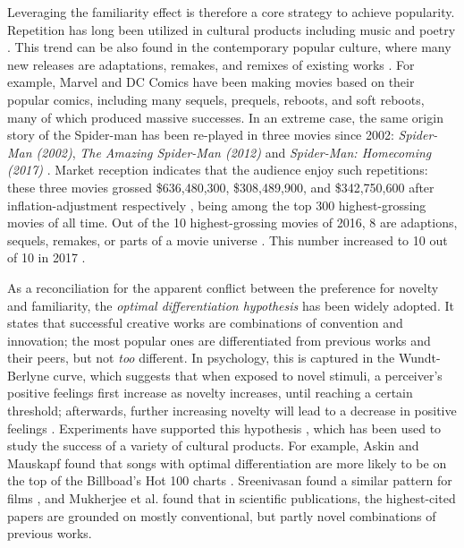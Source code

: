 \documentclass[letterpaper]{article} %
\begin{document}
Leveraging the familiarity effect is therefore a core strategy to achieve popularity. Repetition has long been utilized in cultural products including music and poetry \cite{huron2013psychological}. This trend can be also found in the contemporary popular culture, where many new releases are adaptations, remakes, and remixes of existing works \cite{manovich2007comes}. For example, Marvel and DC Comics have been making movies based on their popular comics, including many sequels, prequels, reboots, and soft reboots, many of which produced massive successes. In an extreme case, the same origin story of the Spider-man has been re-played in three movies since 2002: \emph{Spider-Man (2002)}, \emph{The Amazing Spider-Man (2012)} and \emph{Spider-Man: Homecoming (2017)} \cite{spiderman}. Market reception indicates that the audience enjoy such repetitions: these three movies grossed \$636,480,300, \$308,489,900, and \$342,750,600 after inflation-adjustment respectively \cite{spider-gross}, being among the top 300 highest-grossing movies of all time. Out of the 10 highest-grossing movies of 2016, 8 are adaptions, sequels, remakes, or parts of a movie universe \cite{2016film}. This number increased to 10 out of 10 in 2017 \cite{2017film}. 

As a reconciliation for the apparent conflict between the preference for novelty and familiarity, the \emph{optimal differentiation hypothesis} \cite{thompson2017hit} has been widely adopted. It states that successful creative works are combinations of convention and innovation; the most popular ones are differentiated from previous works and their peers, but not \emph{too} different. In psychology, this is captured in the Wundt-Berlyne curve, which suggests that when exposed to novel stimuli, a perceiver's positive feelings first increase as novelty increases, until reaching a certain threshold; afterwards, further increasing novelty will lead to a decrease in positive feelings \cite{berlyne1970novelty}. Experiments have supported this hypothesis \cite{hargreaves1984effects} \cite{sluckin1980liking}, which has been used to study the success of a variety of cultural products. For example, Askin and Mauskapf found that songs with optimal differentiation are more likely to be on the top of the Billboad's Hot 100 charts \cite{askin2017makes}. Sreenivasan found a similar pattern for films \cite{sreenivasan2013quantitative}, and Mukherjee et al. found that in scientific publications, the highest-cited papers are grounded on mostly conventional, but partly novel combinations of previous works. 
\end{document}
